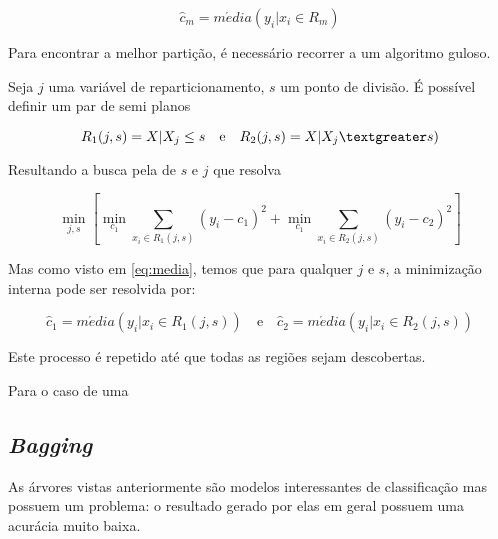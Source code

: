 \begin{equation}
\label{eq:media}
\hat c_{m} = m\acute edia(y_{i} | x_{i} \in R_{m})
\end{equation}

Para encontrar a melhor partição, é necessário recorrer a um algoritmo guloso.

Seja \begin{math}j\end{math} uma variável de reparticionamento, $s$ um ponto de divisão. É possível definir um par de semi planos 

\begin{equation}
R_{1}(j,s) = {X | X_{j}\leq s} \quad \textrm{e} \quad R_{2}(j,s) = {X | X_{j}\textgreater s})
\end{equation}

Resultando a busca pela de \begin{math}s\end{math} e \begin{math}j\end{math} que resolva

\begin{equation}
\min_{j,s} \left [ \min_{c_{1}} \sum_{x_{i} \in R_{1} (j,s)} (y_{i} - c_{1})^{2} + \min_{c_{1}} \sum_{x_{i} \in R_{2} (j,s)}(y_{i} - c_{2})^{2} \right ]
\end{equation} 


Mas como visto em \ref{eq:media}, temos que para qualquer $j$ e $s$, a minimização interna pode ser resolvida por:

\begin{equation}
\hat c_{1} = m\acute edia(y_{i} | x_{i} \in R_{1}(j,s)) \quad \textrm{e} \quad \hat c_{2} = m\acute edia(y_{i} | x_{i} \in R_{2}(j,s))
\end{equation} 

Este processo é repetido até que todas as regiões sejam descobertas.

Para o caso de uma 

\subsection{\emph{Bagging}}

As árvores vistas anteriormente são modelos interessantes de classificação mas possuem um problema: o resultado gerado por elas em geral possuem uma acurácia muito baixa.



